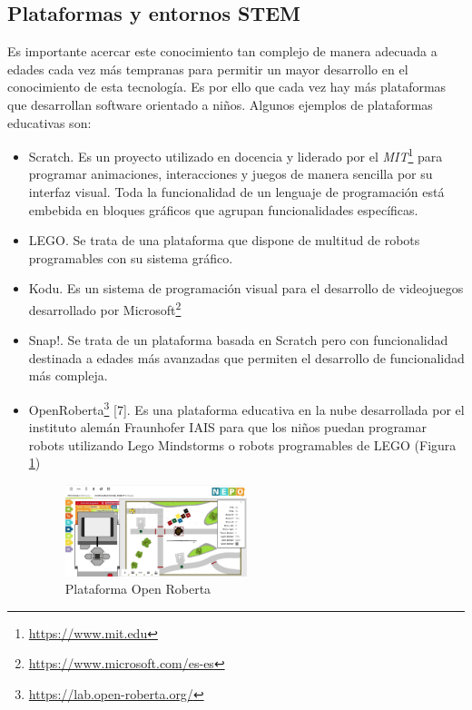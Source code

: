 \subsection{Plataformas y entornos STEM}
Es importante acercar este conocimiento tan complejo de manera adecuada a edades cada vez más tempranas para permitir un mayor desarrollo en el conocimiento de esta tecnología. Es por ello que cada vez hay más plataformas que desarrollan software orientado a niños. Algunos ejemplos de plataformas educativas son: 
\begin{itemize}
  \item Scratch\cite{Scratch}. Es un proyecto utilizado en docencia y liderado por el \textit{MIT}\footnote{\url{https://www.mit.edu}} para programar animaciones, interacciones y juegos de manera sencilla por su interfaz visual. Toda la funcionalidad de un lenguaje de programación está embebida en bloques gráficos que agrupan funcionalidades específicas.
  \item LEGO\cite{Lego}. Se trata de una plataforma que dispone de multitud de robots programables con su sistema gráfico.
  \item Kodu\cite{Kodu}. Es un sistema de programación visual para el desarrollo de videojuegos desarrollado por Microsoft\footnote{\url{https://www.microsoft.com/es-es}}
  \item Snap!\cite{Snap}. Se trata de un plataforma basada en Scratch pero con funcionalidad destinada a edades más avanzadas que permiten el desarrollo de funcionalidad más compleja.
  \item OpenRoberta\footnote{\url{https://lab.open-roberta.org/}} [7]. Es una plataforma educativa en la nube desarrollada por el instituto alemán Fraunhofer IAIS para que los niños puedan programar robots utilizando Lego Mindstorms o robots programables de LEGO (Figura \ref{fig.roberta})
  \begin{figure}[H]
  \begin{center}
    \includegraphics[width=0.5\textwidth]{figures/introduccion/openRoberta.png}
		\caption{Plataforma Open Roberta}
		\label{fig.roberta}
		\end{center}
\end{figure}

\end{itemize}
